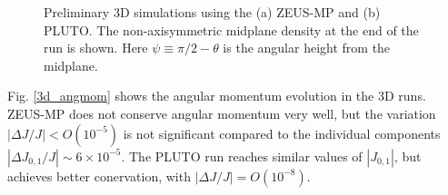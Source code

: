 \begin{figure}
\begin{center}
{    }
  \end{center}
  \caption{Preliminary 3D simulations using the (a) ZEUS-MP and (b)
    PLUTO. The non-axisymmetric midplane density at the end of the run
    is shown. Here $\psi \equiv \pi/2 - \theta$ is the angular height
    from the midplane.\label{3d_prelim}}   
\end{figure}




Fig. \ref{3d_angmom} shows the angular momentum evolution in the 3D
runs. ZEUS-MP does not conserve angular momentum very well, but
the variation $|\Delta J/J|< O(10^{-5})$ is not significant compared
to the individual components $|\Delta J_{0,1}/J|\sim 
6\times10^{-5}$. The PLUTO run reaches similar values of
$|J_{0,1}|$, but achieves better conervation, with $|\Delta
J/J|=O(10^{-8})$. 



